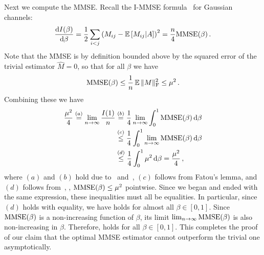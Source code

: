 Next we compute the MMSE.  Recall the I-MMSE formula~\cite{GuoShamaiVerdu05} for Gaussian channels:
\begin{equation}
\frac{{\rm d} I(\beta)}{{\rm d} \beta} = \frac{1}{2} \sum_{i<j} \left( M_{ij} - \mathbb{E}\left[ M_{ij} | A  \right] \right)^2  
= \frac{n}{4} {\rm MMSE}(\beta) \,.
\label{eq:i-mmse}
\end{equation}
Note that the MMSE is by definition bounded above by the squared error of the trivial estimator $\hat{M} = 0$, so that for all $\beta$ we have
\begin{equation}
 {\rm MMSE}(\beta) \le \frac{1}{n} \,\mathbb{E} \, \| M \|_{\rm F}^2 \le \mu^2 \, .
 \label{eq:trivial}
\end{equation}
Combining these we have
\begin{align*}
 \frac{\mu^2}{4}   \overset{(a)}{=} \lim_{n \to \infty} \frac{I(1)}{n} 
 & \overset{(b)}{=} \frac{1}{4}  \lim_{n \to \infty} \int_{0}^{1}  {\rm MMSE}(\beta) \,{\rm d} \beta  \\
  & \overset{(c)}{ \le} \frac{1}{4} \int_{0}^{1}  \lim_{n\to \infty}   {\rm MMSE}(\beta) \,{\rm d} \beta  \\
  &  \overset{(d)}{\le}  \frac{1}{4} \int_{0}^{1}  \mu^2  \,{\rm d} \beta
   = \frac{\mu^2}{4} \, , 
\end{align*}
where $(a)$ and $(b)$ hold due to~ and~, $(c)$ follows from Fatou's lemma, and $(d)$ follows from~, \ie, ${\rm MMSE}(\beta) \leq \mu^2$ pointwise. Since we began and ended with the same expression, these inequalities must all be equalities.  In particular, since $(d)$ holds with equality, we have  holds
for almost all $\beta \in [0,1]$.  Since ${\rm MMSE}(\beta)$ is a non-increasing function of $\beta$, 
its limit $\lim_{n \to \infty}   {\rm MMSE}(\beta)$ is also non-increasing in $\beta$.  Therefore,   
holds for all $\beta \in [0, 1]$.  This completes the proof of our claim that the optimal MMSE estimator cannot outperform the trivial one asymptotically.

